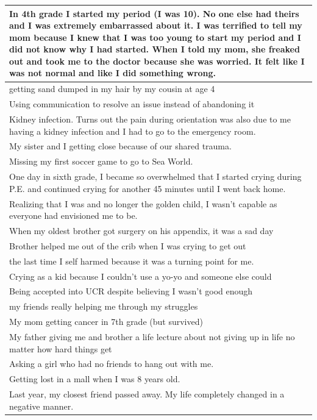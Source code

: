 \documentclass[
  .7em,
  letterpaper,
  DIV=11,
  numbers=noendperiod]{scrartcl}
\begin{document}
\begin{table}
\begin{tabular}{l}
\hline
In 4th grade I started my period (I was 10). No one else had theirs and I was extremely embarrassed about it. I was terrified to tell my mom because I knew that I was too young to start my period and I did not know why I had started. When I told my mom, she freaked out and took me to the doctor because she was worried. It felt like I was not normal and like I did something wrong.\\
\hline
getting sand dumped in my hair by my cousin at age 4\\
\hline
Using communication to resolve an issue instead of abandoning it\\
\hline
Kidney infection. Turns out the pain during orientation was also due to me having a kidney infection and I had to go to the emergency room.\\
\hline
My sister and I getting close because of our shared trauma.\\
\hline
Missing my first soccer game to go to Sea World.\\
\hline
One day in sixth grade, I became so overwhelmed that I started crying during P.E. and continued crying for another 45 minutes until I went back home.\\
\hline
Realizing that I was and no longer the golden child, I wasn't capable as everyone had envisioned me to be.\\
\hline
When my oldest brother got surgery on his appendix, it was a sad day\\
\hline
Brother helped me out of the crib when I was crying to get out\\
\hline
the last time I self harmed because it was a turning point for me.\\
\hline
Crying as a kid because I couldn't use a yo-yo and someone else could\\
\hline
Being accepted into UCR despite believing I wasn't good enough\\
\hline
my friends really helping me through my struggles\\
\hline
My mom getting cancer in 7th grade (but survived)\\
\hline
My father giving me and brother a life lecture about not giving up in life no matter how hard things get\\
\hline
Asking a girl who had no friends to hang out with me.\\
\hline
Getting lost in a mall when I was 8 years old.\\
\hline
Last year, my closest friend passed away. My life completely changed in a negative manner.\\

\end{tabular}
\end{table}
\end{document}
